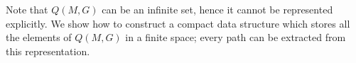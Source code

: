 
Note that $Q(M, G)$ can be an infinite set, hence it cannot be represented explicitly. 
We show how to construct a compact data structure which stores all the elements of $Q(M,G)$ in a finite space; every path can be extracted from this representation. 


